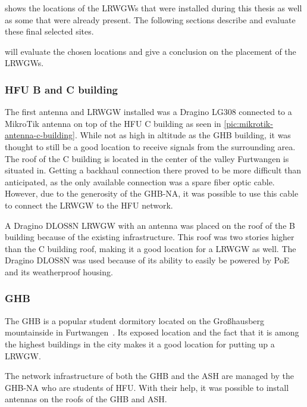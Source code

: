  shows the locations of the \aclp{LRWGW} that were installed during this thesis as well as some that were already present.
The following sections describe and evaluate these final selected sites.

 will evaluate the chosen locations and give a conclusion on the placement of the \aclp{LRWGW}.

\subsubsection{\acl{HFU} B and C building}

The first antenna and \acl{LRWGW} installed was a Dragino LG308 connected to a MikroTik antenna on top of the \ac{HFU} C building as seen in \cref{pic:mikrotik-antenna-c-building}.
While not as high in altitude as the \ac{GHB} building, it was thought to still be a good location to receive signals from the surrounding area.
The roof of the C building is located in the center of the valley Furtwangen is situated in.
Getting a backhaul connection there proved to be more difficult than anticipated, as the only available connection was a spare fiber optic cable.
However, due to the generosity of the \acl{GHB-NA}, it was possible to use this cable to connect the \acl{LRWGW} to the \ac{HFU} network.

A Dragino DLOS8N \acl{LRWGW} with an antenna was placed on the roof of the B building because of the existing infrastructure.
This roof was two stories higher than the C building roof, making it a good location for a \acl{LRWGW} as well.
The Dragino DLOS8N was used because of its ability to easily be powered by \ac{PoE} and its weatherproof housing.

\subsubsection{\acl{GHB}}

The \ac{GHB} is a popular student dormitory located on the Großhausberg mountainside in Furtwangen~\cite{ghb_netadmins_student_2023}.
Its exposed location and the fact that it is among the highest buildings in the city makes it a good location for putting up a \acl{LRWGW}.

The network infrastructure of both the \ac{GHB} and the \ac{ASH} are managed by the \acl{GHB-NA} who are students of \ac{HFU}.
With their help, it was possible to install antennas on the roofs of the \ac{GHB} and \ac{ASH}.

